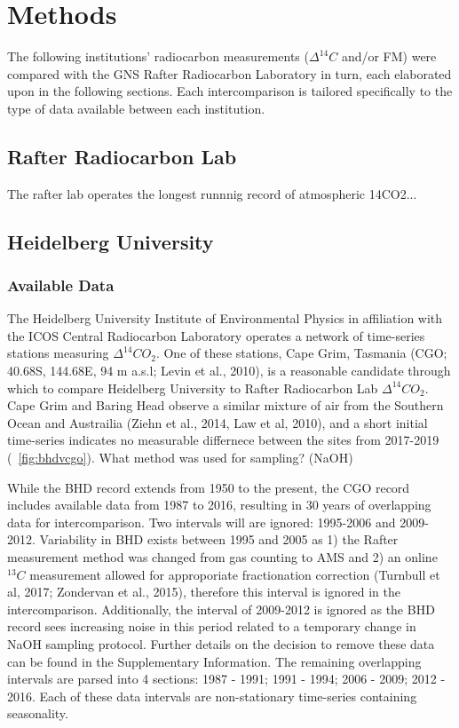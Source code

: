 \section{Methods}
\label{sec:method}


The following institutions' radiocarbon measurements (${\Delta^{14}C}$ and/or FM) 
 were compared with the GNS Rafter Radiocarbon Laboratory in turn, each elaborated upon in the following sections. Each intercomparison is tailored specifically to the type of data available between each institution. 

\subsection{Rafter Radiocarbon Lab}

The rafter lab operates the longest runnnig record of atmospheric 14CO2...

\subsection{Heidelberg University}
\subsubsection{Available Data}

The Heidelberg University Institute of Environmental Physics in affiliation with the ICOS Central Radiocarbon Laboratory operates a network of time-series stations measuring ${\Delta^{14}CO_{2}}$. One of these stations, Cape Grim, Tasmania (CGO; 40.68S, 144.68E, 94 m a.s.l; Levin et al., 2010), is a reasonable candidate through which to compare Heidelberg University to Rafter Radiocarbon Lab ${\Delta^{14}CO_{2}}$. Cape Grim and Baring Head observe a similar mixture of air from the Southern Ocean and Austrailia (Ziehn et al., 2014, Law et al, 2010), and a short initial time-series indicates no measurable differnece between the sites from 2017-2019 (~\ref{fig:bhdvcgo}). 
What method was used for sampling? (NaOH)


While the BHD record extends from 1950 to the present, the CGO record includes available data from 1987 to 2016, resulting in 30 years of overlapping data for intercomparison. 
Two intervals will are ignored: 1995-2006 and 2009-2012.
Variability in BHD exists between 1995 and 2005 as 1) the Rafter measurement method was changed from gas counting to AMS and 2) an online $^{13}C$ measurement allowed for approporiate fractionation correction (Turnbull et al, 2017; Zondervan et al., 2015), therefore this interval is ignored in the intercomparison. 
Additionally, the interval of 2009-2012 is ignored as the BHD record sees increasing noise in this period related to a temporary change in NaOH sampling protocol. Further details on the decision to remove these data can be found in the Supplementary Information. 
The remaining overlapping intervals are parsed into 4 sections: 1987 - 1991; 1991 - 1994; 2006 - 2009; 2012 - 2016. 
Each of these data intervals are non-stationary time-series containing seasonality. 

